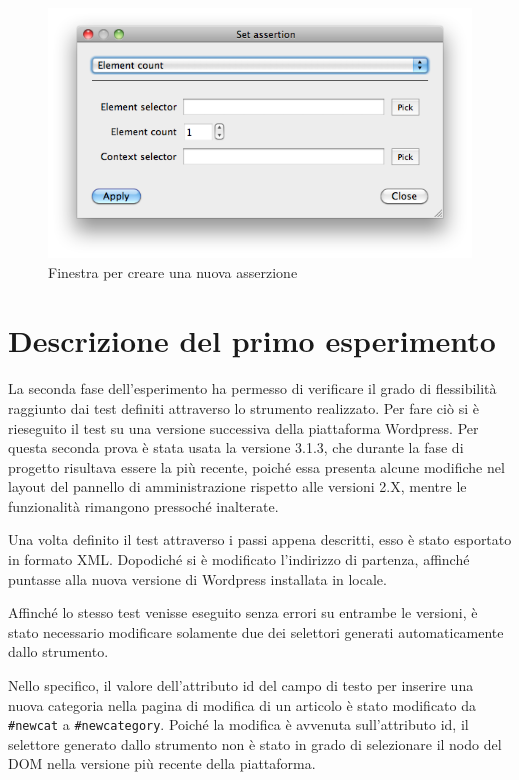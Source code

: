\documentclass[12pt]{toptesi}
\begin{document}
\begin{figure}[htbp]
\begin{center}
\includegraphics[width=\textwidth]{images/wp_tour/9_count_dialog.png}
\caption{Finestra per creare una nuova asserzione}
\label{fig:assertCountDialog}
\end{center}
\end{figure}

\section{Descrizione del primo esperimento}

La seconda fase dell'esperimento ha permesso di verificare il grado di flessibilità raggiunto dai test definiti attraverso lo strumento realizzato. Per fare ciò si è rieseguito il test su una versione successiva della piattaforma Wordpress. Per questa seconda prova è stata usata la versione 3.1.3, che durante la fase di progetto risultava essere la più recente, poiché essa presenta alcune modifiche nel layout del pannello di amministrazione rispetto alle versioni 2.X, mentre le funzionalità rimangono pressoché inalterate.

Una volta definito il test attraverso i passi appena descritti, esso è stato esportato in formato XML. Dopodiché si è modificato l'indirizzo di partenza, affinché puntasse alla nuova versione di Wordpress installata in locale.

Affinché lo stesso test venisse eseguito senza errori su entrambe le versioni, è stato necessario modificare solamente due dei selettori generati automaticamente dallo strumento.

Nello specifico, il valore dell'attributo id del campo di testo per inserire una nuova categoria nella pagina di modifica di un articolo è stato modificato da \verb|#newcat| a \verb|#newcategory|. Poiché la modifica è avvenuta sull'attributo id, il selettore generato dallo strumento non è stato in grado di selezionare il nodo del DOM nella versione più recente della piattaforma.
\end{document}
